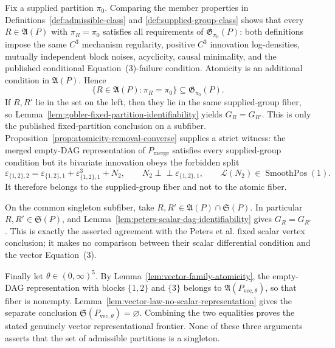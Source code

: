 Fix a supplied partition \(\pi_0\).  Comparing the member properties in
Definitions~\ref{def:admissible-class} and
\ref{def:supplied-group-class} shows that every
\(R\in\mathfrak A(P)\) with \(\pi_R=\pi_0\) satisfies all requirements of
\(\mathfrak G_{\pi_0}(P)\): both definitions impose the same \(C^3\)
mechanism regularity, positive \(C^3\) innovation log-densities, mutually
independent block noises, acyclicity, causal minimality, and the published
conditional Equation~(3)-failure condition.  Atomicity is an additional
condition in \(\mathfrak A(P)\).  Hence
\[
 \{R\in\mathfrak A(P):\pi_R=\pi_0\}
 \subseteq\mathfrak G_{\pi_0}(P).
\]
If \(R,R'\) lie in the set on the left, then they lie in the same supplied-group
fiber, so Lemma~\ref{lem:gobler-fixed-partition-identifiability} yields
\(G_R=G_{R'}\).  This is only the published fixed-partition conclusion on a
subfiber.  Proposition~\ref{prop:atomicity-removal-converse} supplies a strict
witness: the merged empty-DAG representation of \(P_{\mathrm{merge}}\)
satisfies every supplied-group condition but its bivariate innovation obeys
the forbidden split
\[
 \varepsilon_{\{1,2\},2}
 =\varepsilon_{\{1,2\},1}+\varepsilon_{\{1,2\},1}^{3}+N_2,
 \qquad
 N_2\perp\!\!\!\perp\varepsilon_{\{1,2\},1},
 \qquad
 \mathcal L(N_2)\in\operatorname{SmoothPos}(1).
\]
It therefore belongs to the supplied-group fiber and not to the atomic fiber.

On the common singleton subfiber, take
\(R,R'\in\mathfrak A(P)\cap\mathfrak S(P)\).  In particular
\(R,R'\in\mathfrak S(P)\), and
Lemma~\ref{lem:peters-scalar-dag-identifiability} gives \(G_R=G_{R'}\).
This is exactly the asserted agreement with the Peters et al. fixed scalar
vertex conclusion; it makes no comparison between their scalar differential
condition and the vector Equation~(3).

Finally let \(\theta\in(0,\infty)^5\).  By
Lemma~\ref{lem:vector-family-atomicity}, the empty-DAG representation with
blocks \(\{1,2\}\) and \(\{3\}\) belongs to
\(\mathfrak A(P_{\mathrm{vec},\theta})\), so that fiber is nonempty.
Lemma~\ref{lem:vector-law-no-scalar-representation} gives the separate
conclusion \(\mathfrak S(P_{\mathrm{vec},\theta})=\varnothing\).  Combining
the two equalities proves the stated genuinely vector representational
frontier.  None of these three arguments asserts that the set of admissible
partitions is a singleton.